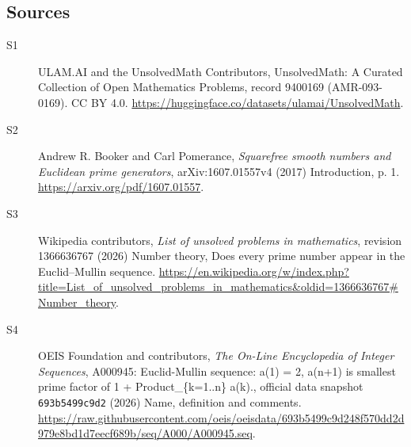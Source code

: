 \documentclass[11pt]{article}
\begin{document}
\subsection{Sources}
\begin{description}
\item[\hypertarget{source:9400169:1}{S1}] ULAM.AI and the UnsolvedMath Contributors, UnsolvedMath: A Curated Collection of Open Mathematics Problems, record 9400169 (AMR-093-0169). CC BY 4.0. \url{https://huggingface.co/datasets/ulamai/UnsolvedMath}.
\item[\hypertarget{source:9400169:2}{S2}] Andrew R. Booker and Carl Pomerance, \emph{Squarefree smooth numbers and Euclidean prime generators}, arXiv:1607.01557v4 (2017) Introduction, p. 1. \url{https://arxiv.org/pdf/1607.01557}.
\item[\hypertarget{source:9400169:3}{S3}] Wikipedia contributors, \emph{List of unsolved problems in mathematics}, revision 1366636767 (2026) Number theory, Does every prime number appear in the Euclid–Mullin sequence. \url{https://en.wikipedia.org/w/index.php?title=List_of_unsolved_problems_in_mathematics&oldid=1366636767#Number_theory}.
\item[\hypertarget{source:9400169:4}{S4}] OEIS Foundation and contributors, \emph{The On-Line Encyclopedia of Integer Sequences}, A000945: Euclid-Mullin sequence: a(1) = 2, a(n+1) is smallest prime factor of 1 + Product\_\{k=1..n\} a(k)., official data snapshot \texttt{693b5499c9d2} (2026) Name, definition and comments. \url{https://raw.githubusercontent.com/oeis/oeisdata/693b5499c9d248f570dd2d979e8bd1d7eecf689b/seq/A000/A000945.seq}.
\end{description}
\label{end:9400169}
\end{document}
